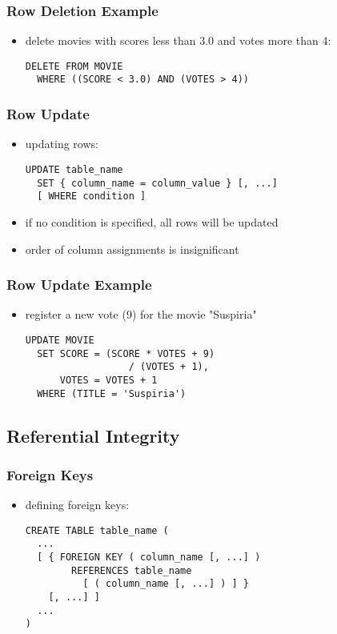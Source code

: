 \documentclass[dvipsnames]{beamer}
\theoremstyle{plain}
\begin{document}
\begin{frame}[fragile]
  \frametitle{Row Deletion Example}

  \begin{itemize}
    \item delete movies with scores less than 3.0 and votes more than 4:
    \begin{lstlisting}
DELETE FROM MOVIE
  WHERE ((SCORE < 3.0) AND (VOTES > 4))
    \end{lstlisting}
  \end{itemize}
\end{frame}

\begin{frame}[fragile]
  \frametitle{Row Update}

  \begin{itemize}
    \item updating rows:
    \begin{lstlisting}
UPDATE table_name
  SET { column_name = column_value } [, ...]
  [ WHERE condition ]
    \end{lstlisting}

    \item if no condition is specified, all rows will be updated
    \item order of column assignments is insignificant
  \end{itemize}
\end{frame}

\begin{frame}[fragile]
  \frametitle{Row Update Example}

  \begin{itemize}
    \item register a new vote (9) for the movie "Suspiria"
    \begin{lstlisting}
UPDATE MOVIE
  SET SCORE = (SCORE * VOTES + 9)
                  / (VOTES + 1),
      VOTES = VOTES + 1
  WHERE (TITLE = 'Suspiria')
    \end{lstlisting}
  \end{itemize}
\end{frame}

\subsection{Referential Integrity}

\begin{frame}[fragile]
  \frametitle{Foreign Keys}

  \begin{itemize}
    \item defining foreign keys:
    \begin{lstlisting}
CREATE TABLE table_name (
  ...
  [ { FOREIGN KEY ( column_name [, ...] )
        REFERENCES table_name
          [ ( column_name [, ...] ) ] }
    [, ...] ]
  ...
)
    \end{lstlisting}
  \end{itemize}
\end{frame}
\end{document}
